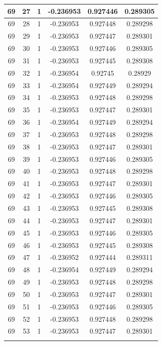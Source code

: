 \documentclass[12pt,a4paper]{article}
\numberwithin{equation}{section}
\numberwithin{figure}{section}
\numberwithin{table}{section}
\begin{document}
\begin{longtable}{|c|c|c|c|c|c|}
69 & 27 & 1 & -0.236953 & 0.927446 & 0.289305 \\ \hline
69 & 28 & 1 & -0.236953 & 0.927448 & 0.289298 \\ \hline
69 & 29 & 1 & -0.236953 & 0.927447 & 0.289301 \\ \hline
69 & 30 & 1 & -0.236953 & 0.927446 & 0.289305 \\ \hline
69 & 31 & 1 & -0.236953 & 0.927445 & 0.289308 \\ \hline
69 & 32 & 1 & -0.236954 & 0.92745 & 0.28929 \\ \hline
69 & 33 & 1 & -0.236954 & 0.927449 & 0.289294 \\ \hline
69 & 34 & 1 & -0.236953 & 0.927448 & 0.289298 \\ \hline
69 & 35 & 1 & -0.236953 & 0.927447 & 0.289301 \\ \hline
69 & 36 & 1 & -0.236954 & 0.927449 & 0.289294 \\ \hline
69 & 37 & 1 & -0.236953 & 0.927448 & 0.289298 \\ \hline
69 & 38 & 1 & -0.236953 & 0.927447 & 0.289301 \\ \hline
69 & 39 & 1 & -0.236953 & 0.927446 & 0.289305 \\ \hline
69 & 40 & 1 & -0.236953 & 0.927448 & 0.289298 \\ \hline
69 & 41 & 1 & -0.236953 & 0.927447 & 0.289301 \\ \hline
69 & 42 & 1 & -0.236953 & 0.927446 & 0.289305 \\ \hline
69 & 43 & 1 & -0.236953 & 0.927445 & 0.289308 \\ \hline
69 & 44 & 1 & -0.236953 & 0.927447 & 0.289301 \\ \hline
69 & 45 & 1 & -0.236953 & 0.927446 & 0.289305 \\ \hline
69 & 46 & 1 & -0.236953 & 0.927445 & 0.289308 \\ \hline
69 & 47 & 1 & -0.236952 & 0.927444 & 0.289311 \\ \hline
69 & 48 & 1 & -0.236954 & 0.927449 & 0.289294 \\ \hline
69 & 49 & 1 & -0.236953 & 0.927448 & 0.289298 \\ \hline
69 & 50 & 1 & -0.236953 & 0.927447 & 0.289301 \\ \hline
69 & 51 & 1 & -0.236953 & 0.927446 & 0.289305 \\ \hline
69 & 52 & 1 & -0.236953 & 0.927448 & 0.289298 \\ \hline
69 & 53 & 1 & -0.236953 & 0.927447 & 0.289301 \\ \hline
\pagebreak

\end{longtable}
\end{document}
